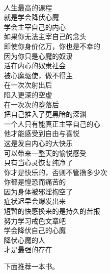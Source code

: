 \begin{adjustwidth}{-1em}{-1em}
    \begin{poem}[大主宰]
        \begin{multicols}{3}
            \centering~\\
            人生最高的课程 \\ 就是学会降伏心魔 \\ 学会主宰自己的内心 \\ 如果你无法主宰自己的念头 \\ 即使你身价亿万，你也是不幸的 \\ 因为你只是心魔的奴隶 \\ 活在内心的奴隶社会 \\ 被心魔驱使，做不得主 \\ 在一次次射出后 \\ 陷入更深的空虚 \\ 在一次次的堕落后 \\ 把自己推入了更黑暗的深渊 \\ 一个人只有能真正主宰自己的心 \\ 他才能感受到自由与喜悦 \\ 这是发自内心的大快乐 \\ 可以带来一整天的愉悦感受 \\ 只有当心灵恢复纯净了 \\ 你才是快乐的，否则不管撸多少次 \\ 你都是惶恐而痛苦的 \\ 因为身体被邪淫掏空了 \\ 症状迟早会爆发出来 \\ 短暂的快感换来的是持久的苦报 \\ 努力学习戒色文章吧 \\ 学会降伏自己的心魔 \\ 降伏心魔的人 \\ 才是最强的存在
        \end{multicols}
    \end{poem}
\end{adjustwidth}

下面推荐一本书。

